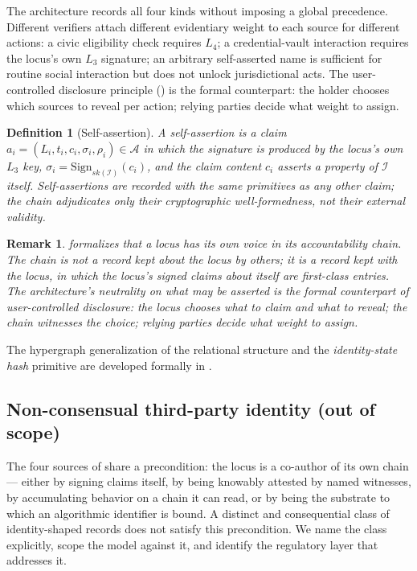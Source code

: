 \documentclass[11pt,a4paper,parskip=half-,DIV=12,headings=standardclasses]{scrartcl}
\theoremstyle{ncthm}
\theoremstyle{ncdef}
\newtheorem{definition}[theorem]{Definition}
\newtheorem{remark}[theorem]{Remark}
\newcommand{\identity}{\mathcal{I}}
\newcommand{\accretion}{\mathcal{A}}
\begin{document}
The architecture records all four kinds without imposing a global
precedence. Different verifiers attach different evidentiary weight to
each source for different actions: a civic eligibility check requires
$L_4$; a credential-vault interaction requires the locus's own $L_3$
signature; an arbitrary self-asserted name is sufficient for routine
social interaction but does not unlock jurisdictional acts. The
user-controlled disclosure principle ()
is the formal counterpart: the holder chooses which sources to reveal
per action; relying parties decide what weight to assign.

\begin{definition}[Self-assertion]\label{def:self-assertion}
A \emph{self-assertion} is a claim $a_i = (L_i, t_i, c_i, \sigma_i, \rho_i) \in \accretion$
in which the signature is produced by the locus's own $L_3$ key,
$\sigma_i = \mathrm{Sign}_{sk(\identity)}(c_i)$, and the claim content
$c_i$ asserts a property of $\identity$ itself. Self-assertions are
recorded with the same primitives as any other claim; the chain
adjudicates only their cryptographic well-formedness, not their
external validity.
\end{definition}

\begin{remark}
 formalizes that a locus has its own voice
in its accountability chain. The chain is not a record kept
\emph{about} the locus by others; it is a record kept \emph{with} the
locus, in which the locus's signed claims about itself are first-class
entries. The architecture's neutrality on what may be asserted is the
formal counterpart of user-controlled disclosure: the locus chooses
what to claim and what to reveal; the chain witnesses the choice;
relying parties decide what weight to assign.
\end{remark}

The hypergraph generalization of the relational structure and the
\emph{identity-state hash} primitive are developed formally in
.

\subsection{Non-consensual third-party identity (out of scope)}\label{subsec:adversarial}

The four sources of  share a precondition: the
locus is a co-author of its own chain --- either by signing claims
itself, by being knowably attested by named witnesses, by accumulating
behavior on a chain it can read, or by being the substrate to which an
algorithmic identifier is bound. A distinct and consequential class of
identity-shaped records does not satisfy this precondition. We name
the class explicitly, scope the model against it, and identify the
regulatory layer that addresses it.
\end{document}

